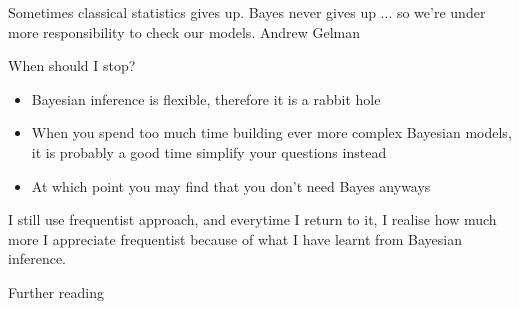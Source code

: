 \documentclass[12pt]{beamer}
\begin{document}
\begin{frame}
Sometimes classical statistics gives up. Bayes never gives up ... so we're under more responsibility to check our models.
Andrew Gelman
\end{frame}

\begin{frame}{When should I stop?}
\begin{itemize}
\item Bayesian inference is flexible, therefore it is a rabbit hole
\item When you spend too much time building ever more complex Bayesian models, it is probably a good time simplify your questions instead
\item At which point you may find that you don't need Bayes anyways
\end{itemize}
\end{frame}

\begin{frame}
I still use frequentist approach, and everytime I return to it, I realise how much more I appreciate frequentist because of what I have learnt from Bayesian inference.
\end{frame}

\begin{frame}{Further reading}

\end{frame}
\end{document}
